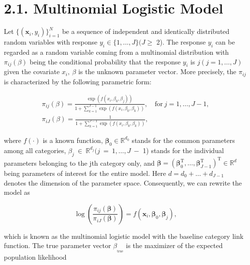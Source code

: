 \documentclass[
  10
]{article}
\begin{document}
\section{2.1. Multinomial Logistic
Model}\label{multinomial-logistic-model}

Let \(\{ ( \pmb { x } _ { i } , y _ { i } ) \} _ { i = 1 } ^ { N }\) be
a sequence of independent and identically distributed random variables
with response \(y _ { i } \in \{ 1 , . . . , J \} ( J \geq\) 2). The
response \(y _ { i }\) can be regarded as a random variable coming from
a multinomial distribution with \(\pi _ { i j } ( \beta )\) being the
conditional probability that the response \(y _ { i }\) is
\(j ( j = 1 , \ldots , J )\) given the covariate \(x _ { i } , ~ \beta\)
is the unknown parameter vector. More precisely, the \(\pi _ { i j }\)
is characterized by the following parametric form:

\[
\begin{array} { l } { \pi _ { i j } ( \beta ) = \displaystyle \frac { \exp ( f ( x _ { i } , \beta _ { 0 } , \beta _ { j } ) ) } { 1 + \sum _ { k = 1 } ^ { J - 1 } \exp ( f ( x _ { i } , \beta _ { 0 } , \beta _ { k } ) ) } , \quad \mathrm { f o r ~ } j = 1 , \ldots , J - 1 , } \\ { \pi _ { i J } ( \beta ) = \displaystyle \frac { 1 } { 1 + \sum _ { k = 1 } ^ { J - 1 } \exp ( f ( x _ { i } , \beta _ { 0 } , \beta _ { k } ) ) } , } \end{array}
\]

where \(f ( \cdot )\) is a known function,
\(\pmb { \beta } _ { 0 } \in \mathbb { R } ^ { d _ { 0 } }\) stands for
the common parameters among all categories,
\(\beta _ { j } ~ \in ~ \mathbb { R } ^ { d _ { j } } ( j ~ = ~ 1 , \ldots , J ~ -\)
1) stands for the individual parameters belonging to the jth category
only, and
\(\pmb { \beta } = ( \pmb { \beta } _ { 0 } ^ { \mathrm { T } } , \dots , \pmb { \beta } _ { J - 1 } ^ { \mathrm { T } } ) ^ { \mathrm { T } } \in \mathbb { R } ^ { d }\)
being parameters of interest for the entire model. Here
\(d = d _ { 0 } + \dots + d _ { J - 1 }\) denotes the dimension of the
parameter space. Consequently, we can rewrite the model as

\[
\log \left( \frac { \pi _ { i j } ( \pmb { \beta } ) } { \pi _ { i J } ( \pmb { \beta } ) } \right) = f ( \pmb { x } _ { i } , \pmb { \beta } _ { 0 } , \pmb { \beta } _ { j } ) ,
\]

which is known as the multinomial logistic model with the baseline
category link function. The true parameter vector
\(\beta _ { \mathrm { { _ { t r u e } } } }\) is the maximizer of the
expected population likelihood
\end{document}
